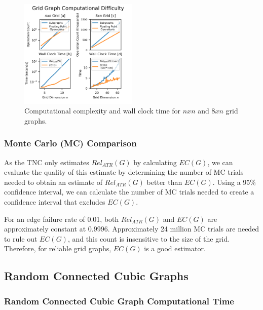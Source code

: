 \documentclass[12pt,twocolumn]{article}
\begin{document}
\begin{figure}[t]
\caption{Computational complexity and wall clock time for $nxn$ and $8xn$ grid graphs.}
\label{fig:Grid Graph Computational Time}
\includegraphics[width=0.5\textwidth]{../figures/GridGraphComputeTime8.png}
\end{figure}

\hypertarget{monte-carlo-mc-comparison}{%
\subsubsection{Monte Carlo (MC) Comparison}\label{monte-carlo-mc-comparison}}

As the TNC only estimates \(Rel_{ATR}(G)\) by calculating \(EC(G)\), we can evaluate the quality of this estimate by determining the number of MC trials needed to obtain an estimate of \(Rel_{ATR}(G)\) better than \(EC(G)\). Using a 95\% confidence interval, we can calculate the number of MC trials needed to create a confidence interval that excludes \(EC(G)\).

For an edge failure rate of 0.01, both \(Rel_{ATR}(G)\) and \(EC(G)\) are approximately constant at 0.9996. Approximately 24 million MC trials are needed to rule out \(EC(G)\), and this count is insensitive to the size of the grid. Therefore, for reliable grid graphs, \(EC(G)\) is a good estimator.

\hypertarget{random-connected-cubic-graphs}{%
\subsection{Random Connected Cubic Graphs}\label{random-connected-cubic-graphs}}

\hypertarget{random-connected-cubic-graph-computational-time}{%
\subsubsection{Random Connected Cubic Graph Computational Time}\label{random-connected-cubic-graph-computational-time}}
\end{document}
